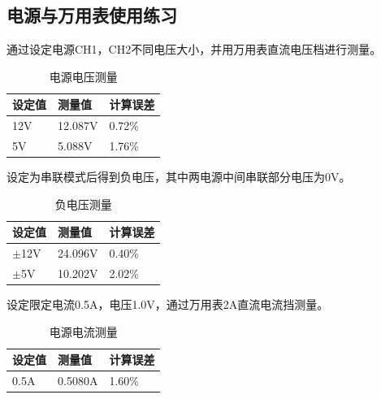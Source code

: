 \documentclass{zjureport}
\begin{document}
\subsection{电源与万用表使用练习}
通过设定电源CH1，CH2不同电压大小，并用万用表直流电压档进行测量。
\begin{table}[H]
  \centering
  \caption{电源电压测量}
  \begin{tabular}{C{.3\textwidth}C{.3\textwidth}C{.3\textwidth}}
  \toprule
  设定值  & 测量值  & 计算误差 \\
  \midrule
  12V  & 12.087V  & 0.72\%  \\
  5V    & 5.088V  & 1.76\%  \\
  \bottomrule
  \end{tabular}
\end{table}

设定为串联模式后得到负电压，其中两电源中间串联部分电压为0V。
\begin{table}[H]
  \centering
  \caption{负电压测量}
  \begin{tabular}{C{.3\textwidth}C{.3\textwidth}C{.3\textwidth}}
  \toprule
  设定值  & 测量值  & 计算误差 \\
  \midrule
  $\pm$12V  & 24.096V  & 0.40\%  \\
  $\pm$5V    & 10.202V  & 2.02\%  \\
  \bottomrule
  \end{tabular}
\end{table}

设定限定电流0.5A，电压1.0V，通过万用表2A直流电流挡测量。
\begin{table}[H]
  \centering
  \caption{电源电流测量}
  \begin{tabular}{C{.3\textwidth}C{.3\textwidth}C{.3\textwidth}}
  \toprule
  设定值  & 测量值  & 计算误差 \\
  \midrule
  0.5A  & 0.5080A  & 1.60\%  \\
  \bottomrule
  \end{tabular}
\end{table}
\end{document}
